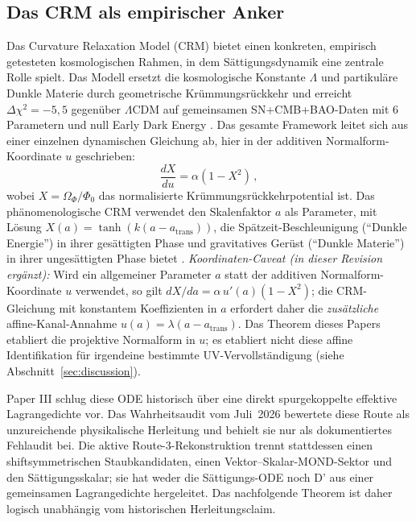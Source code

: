 \documentclass[aps,prd,twocolumn,superscriptaddress,nofootinbib]{revtex4-2}
\begin{document}
\subsection{Das CRM als empirischer Anker}

Das Curvature Relaxation Model (CRM) \cite{Geiger2026,Geiger2026b,Geiger2026c,Geiger2026d} bietet einen konkreten, empirisch getesteten kosmologischen Rahmen, in dem Sättigungsdynamik eine zentrale Rolle spielt. Das Modell ersetzt die kosmologische Konstante $\Lambda$ und partikuläre Dunkle Materie durch geometrische Krümmungsrückkehr und erreicht $\Delta\chi^2 = -5,5$ gegenüber $\Lambda$CDM auf gemeinsamen SN+CMB+BAO-Daten mit 6 Parametern und null Early Dark Energy \cite{Geiger2026b}. Das gesamte Framework leitet sich aus einer einzelnen dynamischen Gleichung ab, hier in der additiven Normalform-Koordinate $u$ geschrieben:
\begin{equation}
\frac{dX}{du} = \alpha(1 - X^2)\,,
\label{eq:saturation_ode}
\end{equation}
wobei $X = \Omega_\Phi/\Phi_0$ das normalisierte Krümmungsrückkehrpotential ist. Das phänomenologische CRM verwendet den Skalenfaktor $a$ als Parameter, mit Lösung $X(a) = \tanh(k(a - a_{\mathrm{trans}}))$, die Spätzeit-Beschleunigung (``Dunkle Energie'') in ihrer gesättigten Phase und gravitatives Gerüst (``Dunkle Materie'') in ihrer ungesättigten Phase bietet \cite{Geiger2026b}. \emph{Koordinaten-Caveat (in dieser Revision ergänzt):} Wird ein allgemeiner Parameter $a$ statt der additiven Normalform-Koordinate $u$ verwendet, so gilt $dX/da = \alpha\,u'(a)(1-X^2)$; die CRM-Gleichung mit konstantem Koeffizienten in $a$ erfordert daher die \emph{zusätzliche} affine-Kanal-Annahme $u(a) = \lambda(a - a_{\mathrm{trans}})$. Das Theorem dieses Papers etabliert die projektive Normalform in $u$; es etabliert nicht diese affine Identifikation für irgendeine bestimmte UV-Vervollständigung (siehe Abschnitt~\ref{sec:discussion}).

Paper III \cite{Geiger2026c} schlug diese ODE historisch über eine direkt spurgekoppelte effektive Lagrangedichte vor. Das Wahrheitsaudit vom Juli~2026 bewertete diese Route als unzureichende physikalische Herleitung und behielt sie nur als dokumentiertes Fehlaudit bei. Die aktive Route-3-Rekonstruktion trennt stattdessen einen shiftsymmetrischen Staubkandidaten, einen Vektor--Skalar-MOND-Sektor und den Sättigungsskalar; sie hat weder die Sättigungs-ODE noch D' aus einer gemeinsamen Lagrangedichte hergeleitet. Das nachfolgende Theorem ist daher logisch unabhängig vom historischen Herleitungsclaim.
\end{document}
